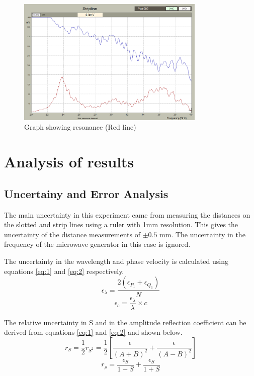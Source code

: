 \documentclass[12pt]{article}
\begin{document}
\begin{figure}[h]
    \centering
    \includegraphics[width=0.8\textwidth]{Plot_2_cropped.png}
    \caption{Graph showing resonance (Red line)}
    \label{fig:freq_responses}
\end{figure}

\section{Analysis of results}

\subsection{Uncertainy and Error Analysis}
The main uncertainty in this experiment came from measuring the distances on the slotted and strip lines
using a ruler with 1mm resolution. This gives the uncertainty of the distance measurements of $\pm0.5$ mm.
The uncertainty in the frequency of the microwave generator in this case is ignored.

The uncertainty in the wavelength and phase velocity is calculated using equations \ref{eq:1} and \ref{eq:2} respectively.
\begin{equation}
    \epsilon_{\lambda} = \frac{2(\epsilon_{P_1}+\epsilon_{Q_1})}{N}
    \label{eq:4}
\end{equation}
\begin{equation}
    \epsilon_{c} = \frac{\epsilon_{\lambda}}{\lambda}\times c
    \label{eq:5}
\end{equation}

The relative uncertainty in S and in the amplitude reflection coefficient can be derived from equations \ref{eq:1} and \ref{eq:2} and shown below.
\begin{equation}
    r_{S} = \frac{1}{2}r_{S^2} = \frac{1}{2} \left[ \frac{\epsilon_{}}{(A+B)^2}+\frac{\epsilon_{}}{(A-B)^2} \right]
    \label{eq:6}
\end{equation}
\begin{equation}
    r_{\rho} = \frac{\epsilon_{S}}{1-S}+\frac{\epsilon_{S}}{1+S}
    \label{eq:7}
\end{equation}
\end{document}
